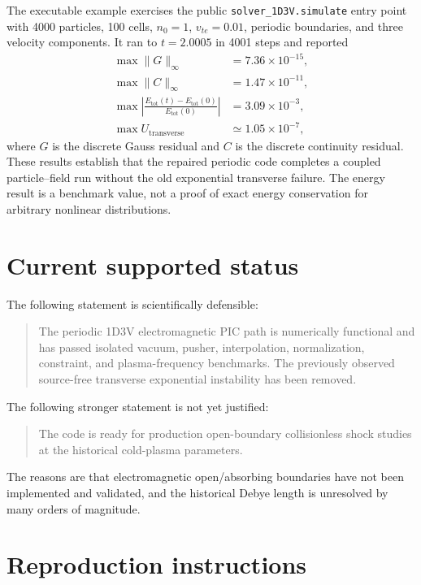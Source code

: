 \documentclass[11pt,a4paper]{article}
\newcommand{\code}[1]{\texttt{#1}}
\begin{document}
The executable example  exercises the public
\code{solver\_1D3V.simulate} entry point with 4000 particles, 100 cells,
$n_0=1$, $v_{te}=0.01$, periodic boundaries, and three velocity components.
It ran to $t=2.0005$ in 4001 steps and reported
\begin{align}
  \max\|G\|_\infty &= 7.36\times10^{-15},\\
  \max\|C\|_\infty &= 1.47\times10^{-11},\\
  \max\left|\frac{E_{\mathrm{tot}}(t)-E_{\mathrm{tot}}(0)}
  {E_{\mathrm{tot}}(0)}\right| &= 3.09\times10^{-3},\\
  \max U_{\mathrm{transverse}} &\simeq 1.05\times10^{-7},
\end{align}
where $G$ is the discrete Gauss residual and $C$ is the discrete continuity
residual.  These results establish that the repaired periodic code completes a
coupled particle--field run without the old exponential transverse failure.
The energy result is a benchmark value, not a proof of exact energy
conservation for arbitrary nonlinear distributions.

\section{Current supported status}

The following statement is scientifically defensible:

\begin{quote}
The periodic 1D3V electromagnetic PIC path is numerically functional and has
passed isolated vacuum, pusher, interpolation, normalization, constraint, and
plasma-frequency benchmarks.  The previously observed source-free transverse
exponential instability has been removed.
\end{quote}

The following stronger statement is not yet justified:

\begin{quote}
The code is ready for production open-boundary collisionless shock studies at
the historical cold-plasma parameters.
\end{quote}

The reasons are that electromagnetic open/absorbing boundaries have not been
implemented and validated, and the historical Debye length is unresolved by
many orders of magnitude.

\section{Reproduction instructions}
\end{document}
